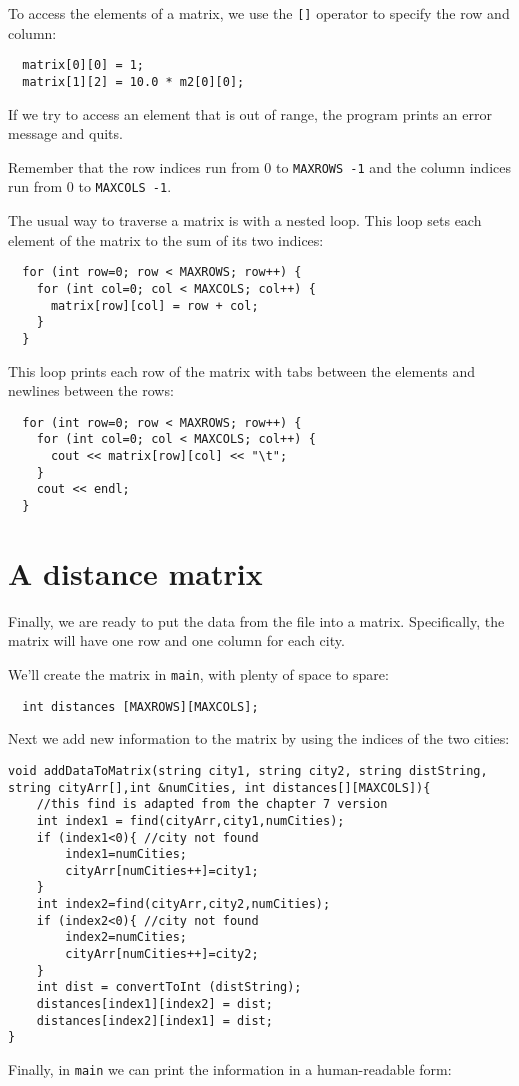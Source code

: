 To access the elements of a matrix, we use the {\tt []} operator
to specify the row and column:

\begin{lstlisting}
  matrix[0][0] = 1;
  matrix[1][2] = 10.0 * m2[0][0];
\end{lstlisting}
%
If we try to access an element that is out of range, the program
prints an error message and quits.


Remember that the row indices run from 0 to
{\tt MAXROWS -1} and the column indices run from 0 to
{\tt MAXCOLS -1}.


The usual way to traverse a matrix is with a nested loop.
This loop sets each element of the matrix to the sum of its
two indices:

\begin{lstlisting}
  for (int row=0; row < MAXROWS; row++) {
    for (int col=0; col < MAXCOLS; col++) {
      matrix[row][col] = row + col;
    }
  }
\end{lstlisting}
%
This loop prints each row of the matrix with tabs between the
elements and newlines between the rows:

\begin{lstlisting}
  for (int row=0; row < MAXROWS; row++) {
    for (int col=0; col < MAXCOLS; col++) {
      cout << matrix[row][col] << "\t";
    }
    cout << endl;
  }
\end{lstlisting}
%

\section{A distance matrix}

Finally, we are ready to put the data from the file into
a matrix.  Specifically, the matrix will have one row and
one column for each city.

We'll create the matrix in {\tt main}, with plenty of space
to spare:

\begin{lstlisting}
  int distances [MAXROWS][MAXCOLS];
\end{lstlisting}
%

Next we add new information to the
matrix by using the indices of the two cities:

\begin{lstlisting}
void addDataToMatrix(string city1, string city2, string distString, string cityArr[],int &numCities, int distances[][MAXCOLS]){
    //this find is adapted from the chapter 7 version
    int index1 = find(cityArr,city1,numCities);
    if (index1<0){ //city not found
        index1=numCities;
        cityArr[numCities++]=city1;
    }
    int index2=find(cityArr,city2,numCities);
    if (index2<0){ //city not found
        index2=numCities;
        cityArr[numCities++]=city2;
    }
    int dist = convertToInt (distString);
    distances[index1][index2] = dist;
    distances[index2][index1] = dist;
}
\end{lstlisting}
%
Finally, in {\tt main} we can print the information in a
human-readable form:

